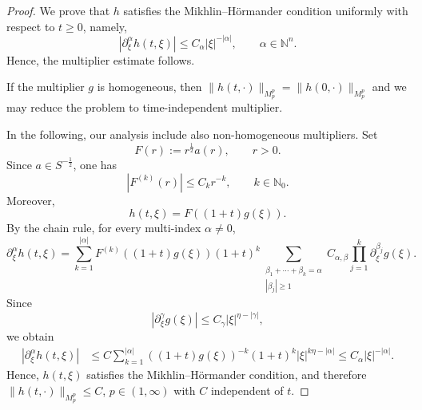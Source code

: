 \documentclass[10pt]{article}
\newcommand{\<}{\langle}
\renewcommand{\>}{\rangle}
\numberwithin{equation}{section}
\begin{document}
\begin{proof}
We prove that $h$ satisfies the Mikhlin--H\"ormander condition uniformly with respect to $t\ge0$, namely,
\[ |\partial_\xi^\alpha h(t, \xi)|\le C_\alpha |\xi|^{-|\alpha|}, \qquad \alpha\in\mathbb N^n. \]
Hence, the multiplier estimate follows.

If the   multiplier $g$ is homogeneous, then
$\|h(t, \cdot)\|_{M_p^p}=\|h(0, \cdot)\|_{M_p^p}$ and we may reduce the problem to time-independent multiplier.

In the following, our analysis include also  non-homogeneous multipliers. Set
\[ F(r):=r^{\frac12}a(r), \qquad r>0. \]
Since $a\in S^{-\frac12}$, one has
\[ |F^{(k)}(r)|\le C_k r^{-k}, \qquad k\in\mathbb N_0. \]
Moreover,
\[ h(t, \xi)=F((1+t)g(\xi)). \]
By the chain rule, for every multi-index $\alpha\neq0$,
\[ \partial_\xi^\alpha h(t, \xi) = \sum_{k=1}^{|\alpha|} F^{(k)}((1+t)g(\xi)) (1+t)^k
\sum_{\substack{\beta_1+\cdots+\beta_k=\alpha\\ |\beta_j|\ge1}}
C_{\alpha,\beta} \prod_{j=1}^k \partial_\xi^{\beta_j}g(\xi). \]
Since
\[ |\partial_\xi^\gamma g(\xi)|\le C_\gamma |\xi|^{\eta-|\gamma|}, \]
we obtain
\begin{align*}
|\partial_\xi^\alpha h(t, \xi)|
&\leq C \sum_{k=1}^{|\alpha|} ((1+t)g(\xi))^{-k}(1+t)^k |\xi|^{k\eta-|\alpha|} \leq C_\alpha |\xi|^{-|\alpha|}.
\end{align*}
Hence, $ h(t, \xi)$ satisfies the Mikhlin--H\"ormander condition, and therefore $\| h(t, \cdot)\|_{M_p^p}\leq C$, $p\in(1,\infty)$ with $C$ independent of $t$. %
\end{proof}
\end{document}
